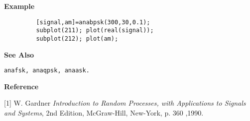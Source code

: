 {\bf \large \sf Example}
\begin{verbatim}
         [signal,am]=anabpsk(300,30,0.1); 
         subplot(211); plot(real(signal));
         subplot(212); plot(am);
\end{verbatim}
\vspace*{.5cm}


{\bf \large \sf See Also}\\
\hspace*{1.5cm}
\begin{minipage}[t]{13.5cm}
\begin{verbatim}
anafsk, anaqpsk, anaask.
\end{verbatim}
\end{minipage}
\vspace*{.5cm}


{\bf \large \sf Reference}\\
\hspace*{1.5cm}
\begin{minipage}[t]{13.5cm}
[1] W. Gardner {\it Introduction to Random Processes, with Applications to
Signals and Systems}, 2nd Edition, McGraw-Hill, New-York, p. 360 ,1990.  
\end{minipage}
